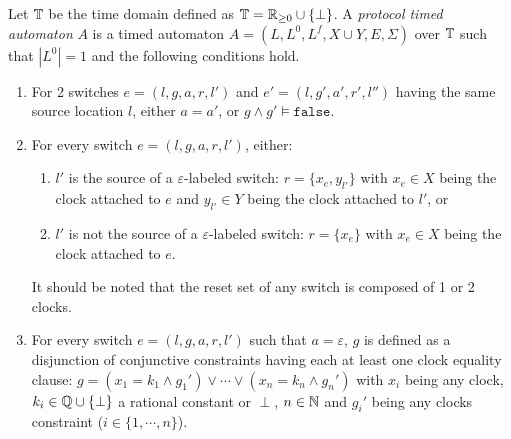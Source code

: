 \begin{definition}
Let $\mathbb{T}$ be the time domain defined as $\mathbb{T} = \mathbb{R}_{\geq 0} \cup \{ \perp \}$.
A \emph{protocol timed automaton} $A$ is a timed automaton $A = (L, L^0, L^f, X \cup Y, E, \Sigma)$ over $\mathbb{T}$ such that $|L^0| = 1$ and the following conditions hold.

\begin{enumerate}

	\item For 2 switches $e = (l, g, a, r, l')$ and $e' = (l, g', a', r', l'')$ having the same source location $l$, either $a = a'$, or $g \wedge g' \models \mathtt{false}$.
	
	\item For every switch $e = (l, g, a, r, l')$, either:
	\begin{enumerate}

	 \item $l'$ is the source of a $\varepsilon$-labeled switch: $r = \{ x_e, y_{l'} \} $ with $x_e \in X$ being the clock attached to $e$ and $y_{l'} \in Y$ being the clock attached to $l'$, or
	 
	 \item $l'$ is not the source of a $\varepsilon$-labeled switch: $r = \{ x_e \} $ with  $x_e \in X$ being the clock attached to $e$.
	 
	\end{enumerate}
	It should be noted that the reset set of any switch is composed of 1 or 2 clocks.
	
	\item For every switch $e = (l, g, a, r, l')$ such that $a = \varepsilon$, $g$ is defined as a disjunction of conjunctive constraints having each at least one clock equality clause: $g = (x_1 = k_1 \wedge g_1') \vee \cdots \vee (x_n = k_n \wedge g_n')$ with $x_i$ being any clock, $k_i \in \mathbb{Q} \cup \{ \perp \}$ a rational constant or $\perp$, $n \in \mathbb{N}$ and $g_i'$ being any clocks constraint ($i \in \{1, \cdots, n \}$).

\end{enumerate}
\label{def:pta}
\end{definition}

